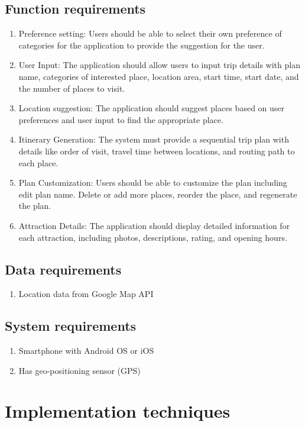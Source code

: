 \subsection{Function requirements}
\begin{enumerate}
	\item Preference setting: Users should be able to select their own preference of
	categories for the application to provide the suggestion for the user.
	\item User Input: The application should allow users to input trip details with plan
	name, categories of interested place, location area, start time, start date, and the
	number of places to visit.
	\item Location suggestion: The application should suggest places based on user
	preferences and user input to find the appropriate place.
	\item Itinerary Generation: The system must provide a sequential trip plan with details
	like order of visit, travel time between locations, and routing path to each place.
	\item Plan Customization: Users should be able to customize the plan including edit
	plan name. Delete or add more places, reorder the place, and regenerate the plan.
	\item Attraction Details: The application should display detailed information for each
	attraction, including photos, descriptions, rating, and opening hours.
\end{enumerate}

\subsection{Data requirements}
\begin{enumerate}
	\item Location data from Google Map API
\end{enumerate}
\subsection{System requirements}
\begin{enumerate}
	\item Smartphone with Android OS or iOS
	\item Has geo-positioning sensor (GPS)
\end{enumerate}
\newpage
\section{Implementation techniques}
